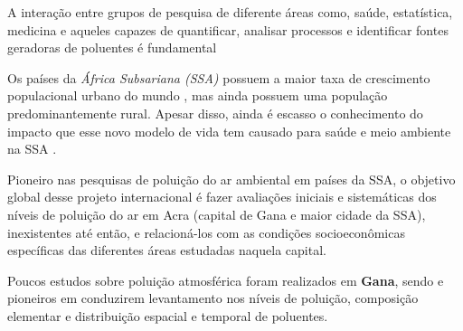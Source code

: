 A interação entre grupos de pesquisa de diferente áreas como, saúde, estatística,
medicina e aqueles capazes de quantificar, analisar processos e 
identificar fontes geradoras de poluentes é fundamental

Os países da \textit{África Subsariana (SSA)} possuem a maior taxa de crescimento 
populacional urbano do mundo \cite{united2006world}, mas ainda possuem uma população 
predominantemente rural. 
Apesar disso, ainda é escasso o conhecimento do impacto que esse novo modelo de vida 
tem causado para saúde e meio ambiente na SSA \cite{cohen2004urban}. 

Pioneiro nas pesquisas de poluição do ar ambiental em países da SSA, o objetivo 
global desse projeto internacional é fazer avaliações iniciais e sistemáticas 
dos níveis de poluição do ar em Acra (capital de Gana e maior cidade da SSA), 
inexistentes até então, e relacioná-los com as condições socioeconômicas 
específicas das diferentes áreas estudadas naquela capital.

Poucos estudos sobre poluição atmosférica foram realizados em \textbf{Gana}, 
sendo \citep{ARKU2008} e \citep{DIONISIO2010} pioneiros em conduzirem 
levantamento nos níveis de poluição, composição elementar e distribuição espacial 
e temporal de poluentes. 



